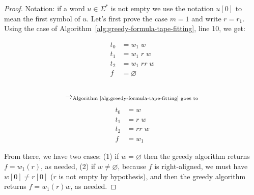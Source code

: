 \begin{proof}
    Notation: if a word $u\in\Sigma^*$ is not empty we use the notation $u[0]$ to mean the first symbol of $u$.
    Let's first prove the case $m=1$ and write $r = r_1$. Using the case of Algorithm~\ref{alg:greedy-formula-tape-fitting}, line 10, we get:
    \setlength{\columnsep}{-7.5cm}
    \begin{multicols}{3}
        \noindent
        \begin{align*}
            t_0 & = w_1\;  w      \\
            t_1 & = w_1\; r\;  w  \\
            t_2 & = w_1\; r r\; w \\
            f   & = \varnothing
        \end{align*}
        \begin{align*}
             & \\
            \to_{\text{Algorithm~\ref{alg:greedy-formula-tape-fitting} goes to}}
        \end{align*}
        \begin{align*}
            t_0 & = w        \\
            t_1 & = r\;  w   \\
            t_2 & = r r\;  w \\
            f   & = w_1
        \end{align*}
    \end{multicols}
    From there, we have two cases: (1) if $w = \varnothing$ then the greedy algorithm returns $f = w_1 (r)$, as needed, (2) if $w \neq \varnothing$, because $f$ is right-aligned, we must have $w[0] \neq r[0]$ ($r$ is not empty by hypothesis), and then the greedy algorithm returns $f = w_1 (r) w$, as needed.



\end{proof}
